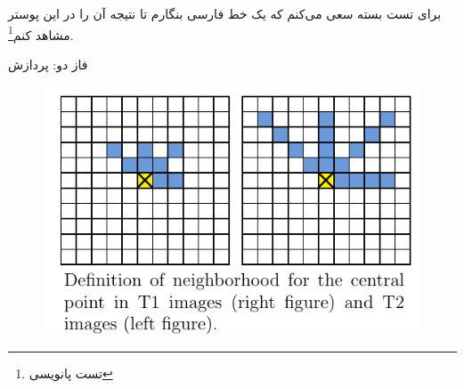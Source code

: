 \documentclass[debug,a0paper,portrait,persian]{xebaposter}
\begin{document}
\begin{poster}

\begin{posterbox}[name=introduction,column=0,row=0]{}
برای تست بسته سعی می‌کنم که یک خط فارسی بنگارم تا نتیجه آن را در این پوستر مشاهد کنم\footnote{تست پانویسی}.
\end{posterbox}
\begin{posterbox}[name=phase2,column=1,span=1]{فاز دو: پردازش}

\begin{figure}
\includegraphics[scale=.5]{fig3}
\end{figure}


\end{posterbox}
\end{poster}
\end{document}
